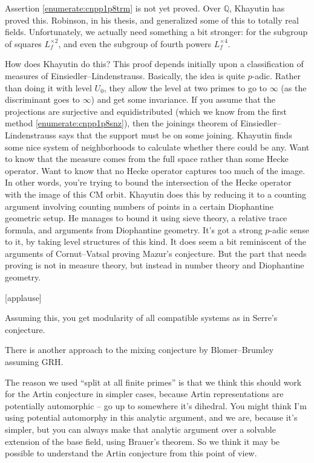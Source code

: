 \documentclass[reqno]{amsart} 
\begin{document}
Assertion \eqref{enumerate:cnpp1p8trm} is not yet proved.  Over $\mathbb{Q}$, Khayutin  has proved this.  Robinson, in his thesis, and generalized some of this to totally real fields.  Unfortunately, we actually need something a bit stronger: for the subgroup of squares $L_f^{\times 2} $, and even the subgroup of fourth powers $L_f^{\times 4}$.

How does Khayutin do this?  This proof depends initially upon a classification of measures of Einsiedler--Lindenstrauss.  Basically, the idea is quite $p$-adic.  Rather than doing it with level $U_0$, they allow the level at two primes to go to $\infty$ (as the discriminant goes to $\infty$) and get some invariance.  If you assume that the projections are surjective and equidistributed (which we know from the first method \eqref{enumerate:cnpp1p8snz}), then the joinings theorem of Einsiedler--Lindenstrauss says that the support must be on some joining.  Khayutin finds some nice system of neighborhoods to calculate whether there could be any.  Want to know that the measure comes from the full space rather than some Hecke operator.  Want to know that no Hecke operator captures too much of the image.  In other words, you're trying to bound the intersection of the Hecke operator with the image of this CM orbit.  Khayutin does this by reducing it to a counting argument involving counting numbers of points in a certain Diophantine geometric setup.  He manages to bound it using sieve theory, a relative trace formula, and arguments from Diophantine geometry.  It's got a strong $p$-adic sense to it, by taking level structures of this kind.  It does seem a bit reminiscent of the arguments of Cornut--Vatsal proving Mazur's conjecture.  But the part that needs proving is not in measure theory, but instead in number theory and Diophantine geometry.

[applause]

Assuming this, you get modularity of all compatible systems as in Serre's conjecture.

\begin{remark}
  There is another approach to the mixing conjecture by Blomer--Brumley assuming GRH.
\end{remark}

\begin{remark}
  The reason we used ``split at all finite primes'' is that we think this should work for the Artin conjecture in simpler cases, because Artin representations are potentially automorphic -- go up to somewhere it's dihedral.  You might think I'm using potential automorphy in this analytic argument, and we are, because it's simpler, but you can always make that analytic argument over a solvable extension of the base field, using Brauer's theorem.  So we think it may be possible to understand the Artin conjecture from this point of view.
\end{remark}
\end{document}
